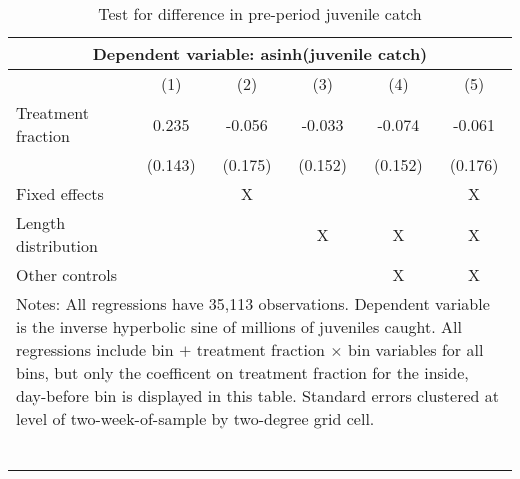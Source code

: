 \begin{table}[tb]
\centering
\caption{Test for difference in pre-period juvenile catch} 
\label{preperiod_juvenilecatch}
\begin{tabular}{lccccc}
   \toprule \multicolumn{6}{c}{Dependent variable: asinh(juvenile catch)} \\ \midrule  & (1) & (2) & (3) & (4) & (5) \\ 
    \midrule Treatment fraction & 0.235 & -0.056 & -0.033 & -0.074 & -0.061 \\ 
   & (0.143) & (0.175) & (0.152) & (0.152) & (0.176) \\ 
    \midrule Fixed effects & & X & & & X\\  Length distribution & & & X & X & X \\ Other controls & & & & X & X \\ \bottomrule \multicolumn{6}{l}{\multirow{2}{12cm}{Notes: All regressions have 35,113 observations. Dependent variable is the inverse hyperbolic sine of millions of juveniles caught. All regressions include bin $+$ treatment fraction $\times$ bin variables for all bins, but only the coefficent on treatment fraction for the inside, day-before bin is displayed in this table. Standard errors clustered at level of two-week-of-sample by two-degree grid cell.}} \\\\\\\\\\\\\\\\ \end{tabular}
\end{table}
